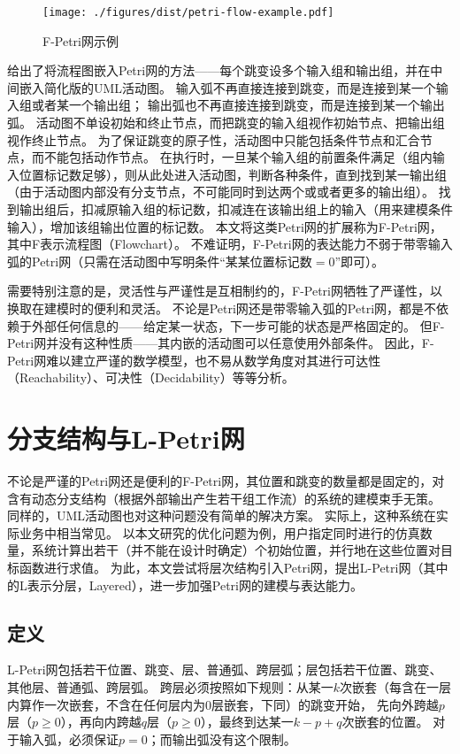 \documentclass[index]{subfiles}
\begin{document}
\begin{figure}[h]
  \centering
  \texttt{[image: ./figures/dist/petri-flow-example.pdf]}
  \caption{F-Petri网示例\label{fig:petri-flow}}
\end{figure}

给出了将流程图嵌入Petri网的方法——每个跳变设多个输入组和输出组，并在中间嵌入简化版的UML活动图。
输入弧不再直接连接到跳变，而是连接到某一个输入组或者某一个输出组；
输出弧也不再直接连接到跳变，而是连接到某一个输出弧。
活动图不单设初始和终止节点，而把跳变的输入组视作初始节点、把输出组视作终止节点。
为了保证跳变的原子性，活动图中只能包括条件节点和汇合节点，而不能包括动作节点。
在执行时，一旦某个输入组的前置条件满足（组内输入位置标记数足够），则从此处进入活动图，判断各种条件，直到找到某一输出组
（由于活动图内部没有分支节点，不可能同时到达两个或或者更多的输出组）。
找到输出组后，扣减原输入组的标记数，扣减连在该输出组上的输入（用来建模条件输入），增加该组输出位置的标记数。
本文将这类Petri网的扩展称为F-Petri网，其中F表示流程图（Flowchart）。
不难证明，F-Petri网的表达能力不弱于带零输入弧的Petri网（只需在活动图中写明条件“某某位置标记数$=0$”即可）。

需要特别注意的是，灵活性与严谨性是互相制约的，F-Petri网牺牲了严谨性，以换取在建模时的便利和灵活。
不论是Petri网还是带零输入弧的Petri网，都是不依赖于外部任何信息的——给定某一状态，下一步可能的状态是严格固定的。
但F-Petri网并没有这种性质——其内嵌的活动图可以任意使用外部条件。
因此，F-Petri网难以建立严谨的数学模型，也不易从数学角度对其进行可达性（Reachability）、可决性（Decidability）等等分析。

\section{分支结构与L-Petri网}
不论是严谨的Petri网还是便利的F-Petri网，其位置和跳变的数量都是固定的，对含有动态分支结构（根据外部输出产生若干组工作流）的系统的建模束手无策。
同样的，UML活动图也对这种问题没有简单的解决方案。
实际上，这种系统在实际业务中相当常见。
以本文研究的优化问题为例，用户指定同时进行的仿真数量，系统计算出若干（并不能在设计时确定）个初始位置，并行地在这些位置对目标函数进行求值。
为此，本文尝试将层次结构引入Petri网，提出L-Petri网（其中的L表示分层，Layered），进一步加强Petri网的建模与表达能力。

\subsection{定义}
L-Petri网包括若干位置、跳变、层、普通弧、跨层弧；层包括若干位置、跳变、其他层、普通弧、跨层弧。
跨层必须按照如下规则：从某一$k$次嵌套（每含在一层内算作一次嵌套，不含在任何层内为0层嵌套，下同）的跳变开始，
先向外跨越$p$层（$p\geq 0$），再向内跨越$q$层（$p\geq 0$），最终到达某一$k-p+q$次嵌套的位置。
对于输入弧，必须保证$p=0$；而输出弧没有这个限制。
\end{document}
